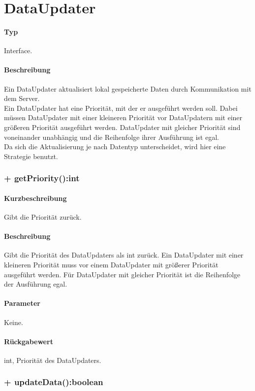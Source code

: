 \section{DataUpdater}
\paragraph*{Typ}
Interface.
\paragraph*{Beschreibung}
Ein DataUpdater aktualisiert lokal gespeicherte Daten durch Kommunikation mit dem Server.\\
Ein DataUpdater hat eine Priorität, mit der er ausgeführt werden soll. Dabei müssen 
DataUpdater mit einer kleineren Priorität vor DataUpdatern mit einer größeren Priorität 
ausgeführt werden. DataUpdater mit gleicher Priorität sind voneinander unabhängig und
die Reihenfolge ihrer Ausführung ist egal.\\
Da sich die Aktualisierung je nach Datentyp unterscheidet, wird hier eine Strategie benutzt.

\subsubsection{+ getPriority():int}%
\paragraph*{Kurzbeschreibung}
Gibt die Priorität zurück.
\paragraph*{Beschreibung}
Gibt die Priorität des DataUpdaters als int zurück. Ein DataUpdater mit einer kleineren
Priorität muss vor einem DataUpdater mit größerer Priorität ausgeführt werden.
Für DataUpdater mit gleicher Priorität ist die Reihenfolge der Ausführung egal.
\paragraph*{Parameter}
Keine.
\paragraph*{Rückgabewert}
int, Priorität des DataUpdaters.

\subsubsection{+ updateData():boolean}%
